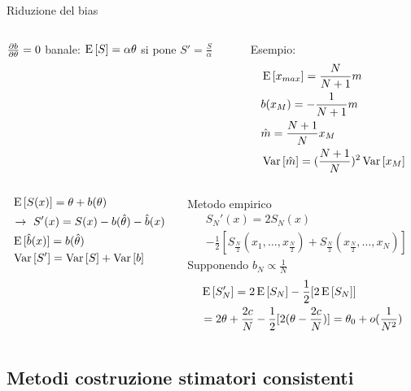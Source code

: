 \documentclass[asd-beamer.tex]{subfiles}%
\begin{document}
\begin{frame}{Riduzione del bias}
	\begin{columns}[T]
		\begin{column}{0.5\textwidth}
			$\frac{\partial b}{\partial \theta}=0$ banale: $\operatorname{E}{[S]}=\alpha\theta$ si pone $S'=\frac{S}{\alpha}$
		\end{column}
		\begin{column}{0.5\textwidth}
			Esempio:
			\begin{align*}
			&\operatorname{E}{[x_{max}]}=\frac{N}{N+1}m\\
			&b(x_M)=-\frac{1}{N+1}m\\
			&\hat{m}=\frac{N+1}{N}x_M\\
			&\operatorname{Var}{[\hat{m}]}=(\frac{N+1}{N})^2\operatorname{Var}{[x_M]}
			\end{align*}
		\end{column}
	\end{columns}
	\begin{columns}[T]
		\begin{column}{0.5\textwidth}
			\begin{align*}
			&\operatorname{E}{[S(x)]}=\theta+b(\theta)\\
			&\to\ S'(x)=S(x)-b(\hat{\theta})-\hat{b}(x)\\
			&\operatorname{E}{[\hat{b}(x)]}=b(\hat{\theta})\\
			&\operatorname{Var}{[S']}=\operatorname{Var}{[S]}+\operatorname{Var}{[b]}
			\end{align*}
		\end{column}
		\begin{column}{0.5\textwidth}
			Metodo empirico
			\begin{align*}
			&S_N'(x)=2S_N(x)\\
			&-\frac{1}{2}[S_{\frac{N}{2}}(x_1,\ldots,x_{\frac{N}{2}})+S_{\frac{N}{2}}(x_{\frac{N}{2}},\ldots,x_N)]
			\end{align*}
			Supponendo $b_N\propto\frac{1}{N}$
			\begin{align*}
			&\operatorname{E}{[S_N']}=2\operatorname{E}{[S_N]}-\frac{1}{2}[2\operatorname{E}{[S_N]}]\\
			&=2\theta+\frac{2c}{N}-\frac{1}{2}[2(\theta-\frac{2c}{N})]=\theta_0+o(\frac{1}{N^2})
			\end{align*}
		\end{column}
	\end{columns}
\end{frame}

\subsection{Metodi costruzione stimatori consistenti}
\end{document}
